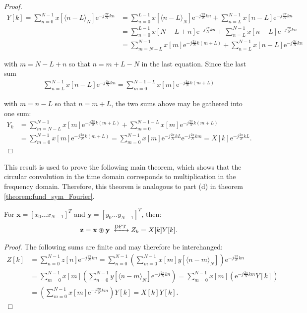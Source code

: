 \begin{proof}
\begin{align*}
Y[k] = \sum_{n=0}^{N-1} x[\langle n-L\rangle_N] \text{e}^{-j\frac{2\pi}{N} kn} &= \sum_{n=0}^{L-1} x[\langle n-L\rangle_N]\text{e}^{-j\frac{2\pi}{N} kn} + \sum_{n=L}^{N-1} x[n-L]\text{e}^{-j\frac{2\pi}{N} kn} \\
&= \sum_{n=0}^{L-1} x[N-L+n]\text{e}^{-j\frac{2\pi}{N} kn} + \sum_{n=L}^{N-1} x[n-L]\text{e}^{-j\frac{2\pi}{N} kn} \\
&= \sum_{m=N-L}^{N-1} x[m]\text{e}^{-j\frac{2\pi}{N} k(m+L)} + \sum_{n=L}^{N-1} x[n-L]\text{e}^{-j\frac{2\pi}{N} kn}
\end{align*}

with $m = N - L + n$ so that $n = m + L - N$ in the last equation. Since the last sum
\begin{align*}
\sum_{n=L}^{N-1} x[n-L]\text{e}^{-j\frac{2\pi}{N} kn} = \sum_{m=0}^{N-1-L} x[m] \text{e}^{-j\frac{2\pi}{N}k(m+L)}
\end{align*}

with $m = n - L$ so that $n = m + L$, the two sums above may be gathered into one sum:
\begin{align*}
Y_k &= \sum_{m=N-L}^{N-1} x[m]\text{e}^{-j\frac{2\pi}{N} k(m+L)} + \sum_{m=0}^{N-1-L} x[m] \text{e}^{-j\frac{2\pi}{N}k(m+L)}  \\
&= \sum_{m=0}^{N-1} x[m] \text{e}^{-j\frac{2\pi}{N}k(m+L)} = \sum_{m=0}^{N-1} x[m] \text{e}^{-j\frac{2\pi}{N}kL}\text{e}^{-j\frac{2\pi}{N}km} = X[k] \text{e}^{-j\frac{2\pi}{N}kL}.
\end{align*}
\end{proof}

This result is used to prove the following main theorem, which shows that the circular convolution in the time domain corresponds to multiplication in the frequency domain. Therefore, this theorem is analogous to part (d) in theorem \ref{theorem:fund_sym_Fourier}.

\begin{theorem}
For $\textbf{x} = [x_0 \dots x_{N-1}]^T$ and $\textbf{y} = [y_0 \dots y_{N-1}]^T$, then:
\begin{align*}
\textbf{z} = \textbf{x} \circledast \textbf{y} \xleftrightarrow{\text{DFT}} Z_k = X[k] Y[k].
\end{align*}
\end{theorem}

\begin{proof}
The following sums are finite and may therefore be interchanged:
\begin{align*}
Z[k] &= \sum_{n=0}^{N-1} z[n] \text{e}^{-j\frac{2\pi}{N}kn} = \sum_{n=0}^{N-1} \left( \sum_{m=0}^{N-1} x[m] y[\langle n-m\rangle_N] \right) \text{e}^{-j\frac{2\pi}{N}kn} \\
&= \sum_{m=0}^{N-1} x[m] \left( \sum_{n=0}^{N-1} y[\langle n-m\rangle_N]\text{e}^{-j\frac{2\pi}{N}kn} \right) = \sum_{m=0}^{N-1} x[m] \left( \text{e}^{-j\frac{2\pi}{N}km}Y[k] \right) \\
&= \left( \sum_{m=0}^{N-1} x[m] \text{e}^{-j\frac{2\pi}{N}km} \right)Y[k] = X[k] Y[k].
\end{align*}
\end{proof}

